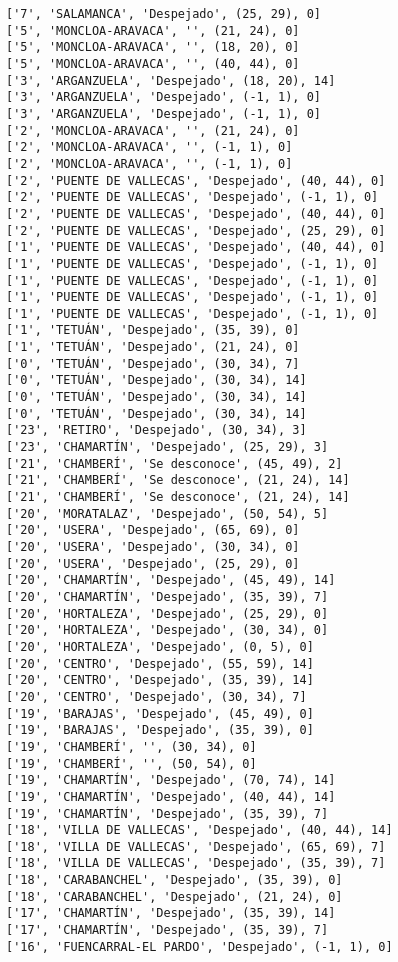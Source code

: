 \documentclass[11pt]{article}
\begin{document}
\begin{Verbatim}[commandchars=\\\{\}]
['7', 'SALAMANCA', 'Despejado', (25, 29), 0]
['5', 'MONCLOA-ARAVACA', '', (21, 24), 0]
['5', 'MONCLOA-ARAVACA', '', (18, 20), 0]
['5', 'MONCLOA-ARAVACA', '', (40, 44), 0]
['3', 'ARGANZUELA', 'Despejado', (18, 20), 14]
['3', 'ARGANZUELA', 'Despejado', (-1, 1), 0]
['3', 'ARGANZUELA', 'Despejado', (-1, 1), 0]
['2', 'MONCLOA-ARAVACA', '', (21, 24), 0]
['2', 'MONCLOA-ARAVACA', '', (-1, 1), 0]
['2', 'MONCLOA-ARAVACA', '', (-1, 1), 0]
['2', 'PUENTE DE VALLECAS', 'Despejado', (40, 44), 0]
['2', 'PUENTE DE VALLECAS', 'Despejado', (-1, 1), 0]
['2', 'PUENTE DE VALLECAS', 'Despejado', (40, 44), 0]
['2', 'PUENTE DE VALLECAS', 'Despejado', (25, 29), 0]
['1', 'PUENTE DE VALLECAS', 'Despejado', (40, 44), 0]
['1', 'PUENTE DE VALLECAS', 'Despejado', (-1, 1), 0]
['1', 'PUENTE DE VALLECAS', 'Despejado', (-1, 1), 0]
['1', 'PUENTE DE VALLECAS', 'Despejado', (-1, 1), 0]
['1', 'PUENTE DE VALLECAS', 'Despejado', (-1, 1), 0]
['1', 'TETUÁN', 'Despejado', (35, 39), 0]
['1', 'TETUÁN', 'Despejado', (21, 24), 0]
['0', 'TETUÁN', 'Despejado', (30, 34), 7]
['0', 'TETUÁN', 'Despejado', (30, 34), 14]
['0', 'TETUÁN', 'Despejado', (30, 34), 14]
['0', 'TETUÁN', 'Despejado', (30, 34), 14]
['23', 'RETIRO', 'Despejado', (30, 34), 3]
['23', 'CHAMARTÍN', 'Despejado', (25, 29), 3]
['21', 'CHAMBERÍ', 'Se desconoce', (45, 49), 2]
['21', 'CHAMBERÍ', 'Se desconoce', (21, 24), 14]
['21', 'CHAMBERÍ', 'Se desconoce', (21, 24), 14]
['20', 'MORATALAZ', 'Despejado', (50, 54), 5]
['20', 'USERA', 'Despejado', (65, 69), 0]
['20', 'USERA', 'Despejado', (30, 34), 0]
['20', 'USERA', 'Despejado', (25, 29), 0]
['20', 'CHAMARTÍN', 'Despejado', (45, 49), 14]
['20', 'CHAMARTÍN', 'Despejado', (35, 39), 7]
['20', 'HORTALEZA', 'Despejado', (25, 29), 0]
['20', 'HORTALEZA', 'Despejado', (30, 34), 0]
['20', 'HORTALEZA', 'Despejado', (0, 5), 0]
['20', 'CENTRO', 'Despejado', (55, 59), 14]
['20', 'CENTRO', 'Despejado', (35, 39), 14]
['20', 'CENTRO', 'Despejado', (30, 34), 7]
['19', 'BARAJAS', 'Despejado', (45, 49), 0]
['19', 'BARAJAS', 'Despejado', (35, 39), 0]
['19', 'CHAMBERÍ', '', (30, 34), 0]
['19', 'CHAMBERÍ', '', (50, 54), 0]
['19', 'CHAMARTÍN', 'Despejado', (70, 74), 14]
['19', 'CHAMARTÍN', 'Despejado', (40, 44), 14]
['19', 'CHAMARTÍN', 'Despejado', (35, 39), 7]
['18', 'VILLA DE VALLECAS', 'Despejado', (40, 44), 14]
['18', 'VILLA DE VALLECAS', 'Despejado', (65, 69), 7]
['18', 'VILLA DE VALLECAS', 'Despejado', (35, 39), 7]
['18', 'CARABANCHEL', 'Despejado', (35, 39), 0]
['18', 'CARABANCHEL', 'Despejado', (21, 24), 0]
['17', 'CHAMARTÍN', 'Despejado', (35, 39), 14]
['17', 'CHAMARTÍN', 'Despejado', (35, 39), 7]
['16', 'FUENCARRAL-EL PARDO', 'Despejado', (-1, 1), 0]

\end{Verbatim}
\end{document}

